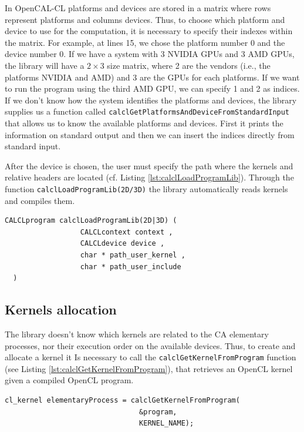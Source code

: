 In OpenCAL-CL platforms and devices are stored in a matrix where rows
represent platforms and columns devices. Thus, to choose which
platform and device to use for the computation, it is necessary to
specify their indexes within the matrix. For example, at lines 15, we
chose the platform number 0 and the device number 0. If we have a
system with 3 NVIDIA GPUs and 3 AMD GPUs, the library will have a $2
\times 3$ size matrix, where 2 are the vendors (i.e., the platforms
NVIDIA and AMD) and 3 are the GPUs for each platforms. If we want to
run the program using the third AMD GPU, we can specify 1 and 2 as
indices. If we don't know how the system identifies the platforms and
devices, the library supplies us a function called
\verb'calclGetPlatformsAndDeviceFromStandardInput' that allows us to
know the available platforms and devices. First it prints the
information on standard output and then we can insert the indices
directly from standard input.

After the device is chosen, the user must specify the path where the
kernels and relative headers are located (cf. Listing
\ref{lst:calclLoadProgramLib}). Through the function
\verb'calclLoadProgramLib(2D/3D)' the library automatically reads
kernels and compiles them.

\begin{lstlisting}[float,floatplacement=H, label=lst:calclLoadProgramLib, caption=The calclLoadProgramLib function., numbers=none]
  CALCLprogram calclLoadProgramLib(2D|3D) (
                  CALCLcontext context ,
                  CALCLdevice device ,
                  char * path_user_kernel ,
                  char * path_user_include
  )
\end{lstlisting}

\subsection{Kernels allocation}

The library doesn't know which kernels are related to the CA
elementary processes, nor their execution order on the available
devices. Thus, to create and allocate a kernel it Is necessary to call
the \verb'calclGetKernelFromProgram' function (see Listing
\ref{lst:calclGetKernelFromProgram}), that retrieves an OpenCL kernel
given a compiled OpenCL program.

\begin{lstlisting}[float,floatplacement=H, label=lst:calclGetKernelFromProgram, caption=The calclGetKernelFromProgram function., numbers=none]
  cl_kernel elementaryProcess = calclGetKernelFromProgram(
                                &program,
                                KERNEL_NAME);
\end{lstlisting}

